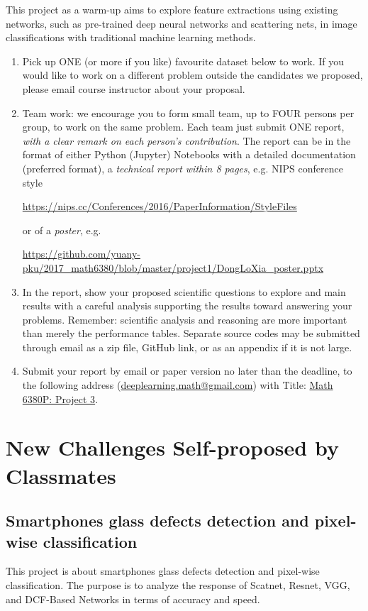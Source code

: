 \documentclass[11pt]{article}
\begin{document}
This project as a warm-up aims to explore feature extractions using existing networks, such as pre-trained deep neural networks and scattering nets, in image classifications with traditional machine learning methods.
\begin{enumerate}
\item Pick up ONE (or more if you like) favourite dataset below to work. If you would like to work on a different problem outside the candidates we proposed, please email course instructor about your proposal.  
\item Team work: we encourage you to form small team, up to FOUR persons per group, to work on the same problem. Each team just submit ONE report, \emph{with a clear remark on each person's contribution}. The report can be in the format of either Python (Jupyter) Notebooks with a detailed documentation (preferred format), a \emph{technical report within 8 pages}, e.g. NIPS conference style 
\begin{center}
\url{https://nips.cc/Conferences/2016/PaperInformation/StyleFiles} 
\end{center}
or of a \emph{poster}, e.g. 
\begin{center}%
\url{https://github.com/yuany-pku/2017_math6380/blob/master/project1/DongLoXia_poster.pptx}
\end{center}
\item In the report, show your proposed scientific questions to explore and main results with a careful analysis supporting the results toward answering your problems. Remember: scientific analysis and reasoning are more important than merely the performance tables. Separate source codes may be submitted through email as a zip file, GitHub link, or as an appendix if it is not large.    
\item Submit your report by email or paper version no later than the deadline, to the following address (\href{mailto:deeplearning.math@gmail.com}{deeplearning.math@gmail.com}) with Title: \underline{Math 6380P: Project 3}. %
\end{enumerate}


\section{New Challenges Self-proposed by Classmates} 

\subsection{Smartphones glass defects detection and pixel-wise classification}
This project is about smartphones glass defects detection and pixel-wise classification. The purpose is to analyze the response of Scatnet, Resnet, VGG, and DCF-Based Networks in terms of accuracy and speed.
\end{document}
